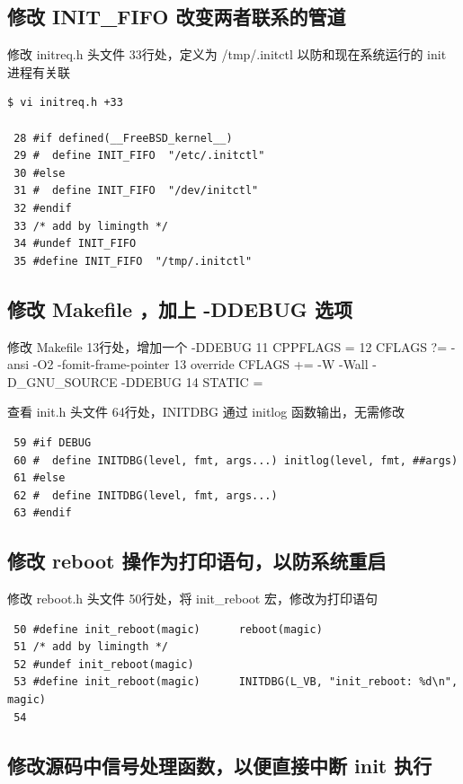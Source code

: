 \subsection{修改 INIT\_FIFO 改变两者联系的管道}

修改 initreq.h 头文件 33行处，定义为 /tmp/.initctl 以防和现在系统运行的
init 进程有关联

{\begin{shaded}\begin{verbatim}
$ vi initreq.h +33

 28 #if defined(__FreeBSD_kernel__)
 29 #  define INIT_FIFO  "/etc/.initctl"
 30 #else
 31 #  define INIT_FIFO  "/dev/initctl"
 32 #endif
 33 /* add by limingth */
 34 #undef INIT_FIFO
 35 #define INIT_FIFO  "/tmp/.initctl"
\end{verbatim}\end{shaded}}
\subsection{修改 Makefile ，加上 -DDEBUG 选项}

修改 Makefile 13行处，增加一个 -DDEBUG 11 CPPFLAGS = 12 CFLAGS ?= -ansi
-O2 -fomit-frame-pointer 13 override CFLAGS += -W -Wall -D\_GNU\_SOURCE
-DDEBUG 14 STATIC =

查看 init.h 头文件 64行处，INITDBG 通过 initlog 函数输出，无需修改

{\begin{shaded}\begin{verbatim}
 59 #if DEBUG
 60 #  define INITDBG(level, fmt, args...) initlog(level, fmt, ##args)
 61 #else
 62 #  define INITDBG(level, fmt, args...)
 63 #endif
\end{verbatim}\end{shaded}}
\subsection{修改 reboot 操作为打印语句，以防系统重启}

修改 reboot.h 头文件 50行处，将 init\_reboot 宏，修改为打印语句

{\begin{shaded}\begin{verbatim}
 50 #define init_reboot(magic)      reboot(magic)
 51 /* add by limingth */
 52 #undef init_reboot(magic)
 53 #define init_reboot(magic)      INITDBG(L_VB, "init_reboot: %d\n", magic)
 54 
\end{verbatim}\end{shaded}}
\subsection{修改源码中信号处理函数，以便直接中断 init 执行}

